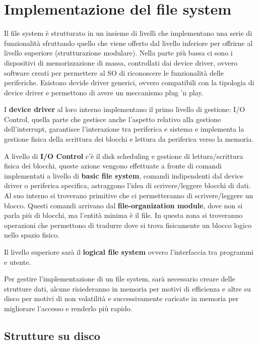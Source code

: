 \documentclass[a4paper, 12pt]{book}
\begin{document}
\section{Implementazione del file system}

Il file system è strutturato in un insieme di livelli che 
implementano una serie di funzionalità sfruttando quello che 
viene offerto dal livello inferiore per offrirne al livello superiore (strutturazione modulare).
Nella parte più bassa ci sono i dispositivi di memorizzazione 
di massa, controllati dai device driver, ovvero software 
creati per permettere al SO di riconoscere le funzionalità 
delle periferiche. Esistono devide driver generici, ovvero 
compatibili con la tipologia di device driver e permettono 
di avere un meccanismo plug 'n play.

I \textbf{device driver} al loro interno implementano il primo livello 
di gestione: I/O Control, quella parte che gestisce anche 
l'aspetto relativo alla gestione dell'interrupt, garantisce 
l'interazione tra periferica e sistema e implementa la 
gestione fisica della scrittura dei blocchi e lettura da 
periferica verso la memoria. 

A livello di \textbf{I/O Control} c'è il disk scheduling 
e gestione di lettura/scrittura fisica dei blocchi, queste 
azione vengono effettuate a fronte di comandi implementati 
a livello di \textbf{basic file system}, comandi indipendenti dal device 
driver o periferica specifica, astraggono l'idea di scrivere/leggere 
blocchi di dati. Al suo interno si troverano primitive che 
ci permetteranno di scrivere/leggere un blocco. Questi comandi 
arrivano dal \textbf{file-organization module}, dove non si 
parla più di blocchi, ma l'entità minima è il file. In questa zona 
si troveranno operazioni che permettono di tradurre dove si trova 
fisicamente un blocco logico nello spazio fisico.

Il livello superiore sarà il \textbf{logical file system} 
ovvero l'interfaccia tra programmi e utente.

Per gestire l'implementazione di un file system, sarà necessario 
creare delle strutture dati, alcune risiederanno in memoria per 
motivi di efficienza e altre su disco per motivi di non 
volatilità e successivamente caricate in memoria per migliorare 
l'accesso e renderlo più rapido.

\subsection{Strutture su disco}
\end{document}
